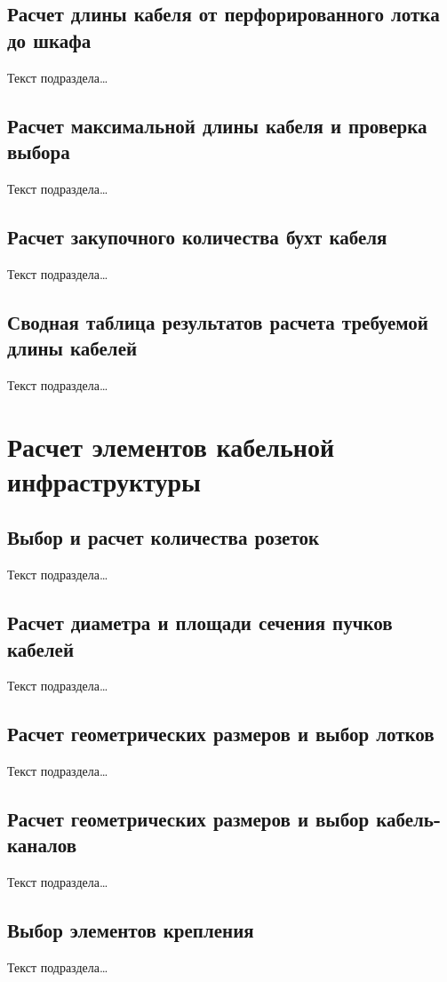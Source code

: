 \documentclass[a4paper,oneside,14pt]{extreport}
\begin{document}
\section{Расчет длины кабеля от перфорированного лотка до шкафа}
Текст подраздела\ldots

\section{Расчет максимальной длины кабеля и проверка выбора}
Текст подраздела\ldots

\section{Расчет закупочного количества бухт кабеля}
Текст подраздела\ldots

\section{Сводная таблица результатов расчета требуемой длины кабелей}
Текст подраздела\ldots


\chapter{Расчет элементов кабельной инфраструктуры}

\section{Выбор и расчет количества розеток}
Текст подраздела\ldots

\section{Расчет диаметра и площади сечения пучков кабелей}
Текст подраздела\ldots

\section{Расчет геометрических размеров и выбор лотков}
Текст подраздела\ldots

\section{Расчет геометрических размеров и выбор кабель-каналов}
Текст подраздела\ldots

\section{Выбор элементов крепления}
Текст подраздела\ldots
\end{document}
